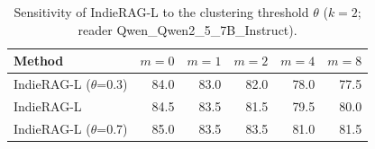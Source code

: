 \begin{table}[tbp]
\centering
\small
\caption{Sensitivity of IndieRAG-L to the clustering threshold $\theta$ ($k{=}2$; reader Qwen\_Qwen2\_5\_7B\_Instruct).}
\label{tab:thr}
\setlength{\tabcolsep}{4pt}
\begin{tabular}{lrrrrr}
\toprule
Method & $m{=}0$ & $m{=}1$ & $m{=}2$ & $m{=}4$ & $m{=}8$ \\
\midrule
IndieRAG-L ($\theta$=0.3) & 84.0 & 83.0 & 82.0 & 78.0 & 77.5 \\
IndieRAG-L & 84.5 & 83.5 & 81.5 & 79.5 & 80.0 \\
IndieRAG-L ($\theta$=0.7) & 85.0 & 83.5 & 83.5 & 81.0 & 81.5 \\
\bottomrule
\end{tabular}
\end{table}
